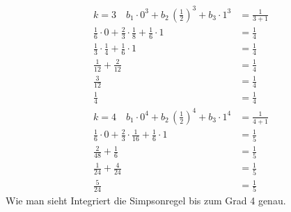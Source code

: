 \documentclass[10pt,a4paper]{article}
\begin{document}
		\begin{align*}
			k=3  \quad  b_1\cdot 0^3+        b_2         \,  \left(\frac{1}{2} \right)^3+  b_3\cdot1^3 & = \frac{1}{3+1} \\
			\frac{1}{6}\cdot 0+  \frac{2}{3}\cdot \frac{1}{8}  +  \frac{1}{6}\cdot 1                   & = \frac{1}{4}   \\
			\frac{1}{3}\cdot \frac{1}{4}  +  \frac{1}{6}\cdot 1                                        & = \frac{1}{4}   \\
			\frac{1}{12} +  \frac{2}{12}                                                               & = \frac{1}{4}   \\
			\frac{3}{12}                                                                               & = \frac{1}{4}   \\
			\frac{1}{4}                                                                                & = \frac{1}{4}   \\
			k=4  \quad  b_1\cdot 0^4+        b_2         \,  \left(\frac{1}{2} \right)^4+  b_3\cdot1^4 & = \frac{1}{4+1} \\
			\frac{1}{6}\cdot 0+  \frac{2}{3}\cdot \frac{1}{16}  +  \frac{1}{6}\cdot 1                  & = \frac{1}{5}   \\
			\frac{2}{48} +  \frac{1}{6}                                                                & = \frac{1}{5}   \\
			\frac{1}{24} +  \frac{4}{24}                                                               & = \frac{1}{5}   \\
			\frac{5}{24}                                                                               & = \frac{1}{5}
		\end{align*}
		Wie man sieht Integriert die Simpsonregel bis zum Grad 4 genau.
    
\end{document}
